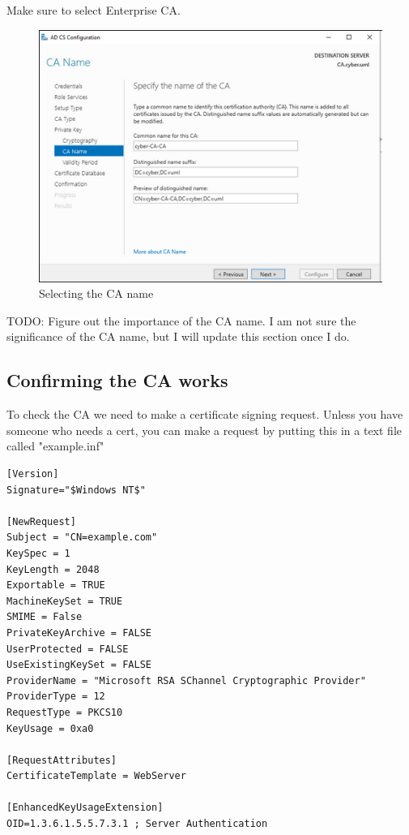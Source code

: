 \documentclass{article}
\begin{document}
Make sure to select Enterprise CA.

\begin{figure}[H]
        \centering
        \includegraphics[width=1\textwidth]{CAName.png}
        \caption{Selecting the CA name}
        \label{fig:CAName}
\end{figure}

TODO: Figure out the importance of the CA name.
I am not sure the significance of the CA name, but I will update this section once I do.

\subsection{Confirming the CA works}

To check the CA we need to make a certificate signing request. 
Unless you have someone who needs a cert, you can make a request by putting this in a text file called "example.inf"

\begin{lstlisting}[breaklines=true, columns=fullflexible]
[Version]
Signature="$Windows NT$"

[NewRequest]
Subject = "CN=example.com"
KeySpec = 1
KeyLength = 2048
Exportable = TRUE
MachineKeySet = TRUE
SMIME = False
PrivateKeyArchive = FALSE
UserProtected = FALSE
UseExistingKeySet = FALSE
ProviderName = "Microsoft RSA SChannel Cryptographic Provider"
ProviderType = 12
RequestType = PKCS10
KeyUsage = 0xa0

[RequestAttributes]
CertificateTemplate = WebServer

[EnhancedKeyUsageExtension]
OID=1.3.6.1.5.5.7.3.1 ; Server Authentication
\end{lstlisting}
\end{document}
